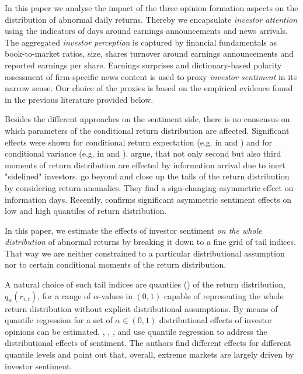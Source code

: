 \documentclass[]{article}
\begin{document}
In this paper we analyse the impact of the three opinion formation aspects on the distribution of abnormal daily returns. Thereby we encapsulate {\it investor attention} using the indicators of days around earnings announcements and news arrivals.  The aggregated {\it investor perception} is captured by financial fundamentals as book-to-market ratios, size, shares turnover around earnings announcements and reported earnings per share. Earnings surprises and dictionary-based polarity assessment of firm-specific news content is used to proxy {\it investor sentiment} in its narrow sense. Our choice of the proxies is based on the empirical evidence found in the previous literature provided below.

Besides the different approaches on the sentiment side, there is no consensus on which parameters of the conditional return distribution are affected. Significant effects were shown for conditional return expectation (e.g. in \cite{HAGENAU2013} and \cite{NGUYEN2015}) and for conditional variance (e.g. in \cite{AUDRINO2020} and \cite{FANG2021}). \cite{Cao2002} argue, that not only second but also third moments of return distribution are effected by information arrival due to inert "sidelined" investors. \cite{ENGELBERG2018} go beyond and close up the tails of the return distribution by considering return anomalies. They find a sign-changing asymmetric effect on information days. Recently, \cite{HE2022} confirms significant asymmetric sentiment effects on low and high quantiles of return distribution.

In this paper, we estimate the effects of investor sentiment {\it{on the whole distribution} } of abnormal returns by breaking it down to a fine grid of tail indices. That way we are neither constrained to a particular distributional assumption nor to certain conditional moments of the return distribution.

A natural choice of such tail indices are quantiles (\cite{Koenker1978}) of the return distribution, $q_{\alpha}(r_{i,t})$, for a range of $\alpha$-values in $(0,1)$ capable of representing the whole return distribution without explicit distributional assumptions. By means of quantile regression for a set of $\alpha\in(0,1)$ distributional effects of investor opinions can be estimated. \cite{NI2015}, \cite{Ma2018}, \cite{ALNASSERI2021}, and \cite{HE2022} use quantile regression to address the distributional effects of sentiment. The authors find different effects for different quantile levels and point out that, overall, extreme markets are largely driven by investor sentiment.
\end{document}
